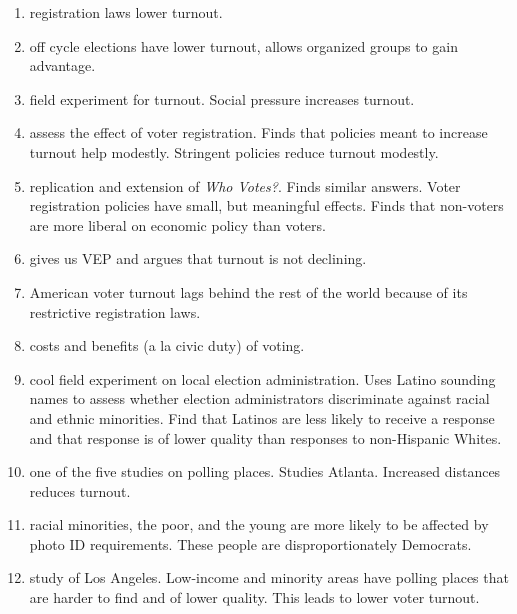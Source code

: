 \documentclass[12pt]{article}
\begin{document}
\begin{enumerate}
\item \citet{rosenstone1978effect} registration laws lower turnout. 

\item \citet{anzia2011election} off cycle elections have lower turnout, allows organized groups to gain advantage. 

\item \citet{gerber2008social} field experiment for turnout. Social pressure increases turnout. 

\item \citet{hanmer2009discount} assess the effect of voter registration. Finds that policies meant to increase turnout help modestly. Stringent policies reduce turnout modestly. 

\item \citet{leighley2013votes} replication and extension of \textit{Who Votes?}. Finds similar answers. Voter registration policies have small, but meaningful effects. Finds that non-voters are more liberal on economic policy than voters. 

\item \citet{mcdonald2001myth} gives us VEP and argues that turnout is not declining. 

\item \citet{powell1986american} American voter turnout lags behind the rest of the world because of its restrictive registration laws. 

\item \citet{riker1968theory} costs and benefits (a la civic duty) of voting. 

\item \citet{white2015need} cool field experiment on local election administration. Uses Latino sounding names to assess whether election administrators discriminate against racial and ethnic minorities. Find that Latinos are less likely to receive a response and that response is of lower quality than responses to non-Hispanic Whites. 

\item \citet{haspel2005location} one of the five studies on polling places. Studies Atlanta. Increased distances reduces turnout. 

\item \citet{barreto2009disproportionate} racial minorities, the poor, and the young are more likely to be affected by photo ID requirements. These people are disproportionately Democrats. 

\item \citet{barreto2009all} study of Los Angeles. Low-income and minority areas have polling places that are harder to find and of lower quality. This leads to lower voter turnout. 


\end{enumerate}
\end{document}
